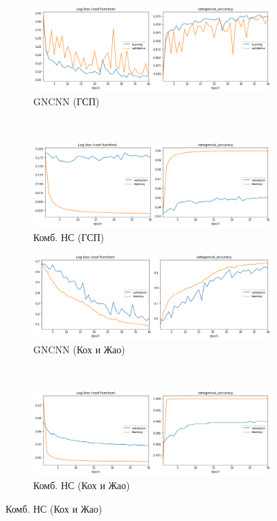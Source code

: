\begin{figure}[p]
    \centering
    \begin{subfigure}[b]{0.485\textwidth}
        \includegraphics[width=\textwidth]{include/graphics/experimental_plots/grayscale/gncnn_hic}
                    \caption{GNCNN (ГСП)}
    \end{subfigure}
    ~
    \begin{subfigure}[b]{0.485\textwidth}
        \includegraphics[width=\textwidth]{include/graphics/experimental_plots/grayscale/mixed_hic}
                    \caption{Комб. НС (ГСП)}
    \end{subfigure}
\bigskip
    \begin{subfigure}[b]{0.485\textwidth}
        \includegraphics[width=\textwidth]{include/graphics/experimental_plots/grayscale/gncnn_koch}
                    \caption{GNCNN (Кох и Жао)}
    \end{subfigure}
    ~
    \begin{subfigure}[b]{0.485\textwidth}
        \includegraphics[width=\textwidth]{include/graphics/experimental_plots/grayscale/mixed_koch}
                    \caption{Комб. НС (Кох и Жао)}
    \end{subfigure}
    

\end{figure}
